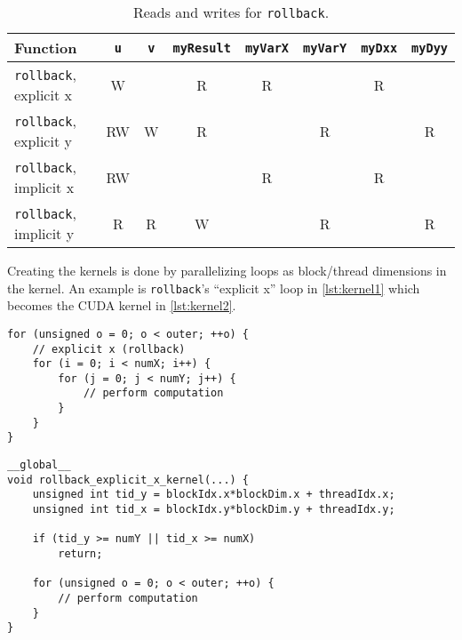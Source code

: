 \documentclass[a4paper]{article}
\begin{document}
\begin{table}
    \centering
    \begin{tabular}{lccccccc}
        \toprule
        \textbf{Function}             & \texttt{u} & \texttt{v} & \texttt{myResult} & \texttt{myVarX} & \texttt{myVarY} & \texttt{myDxx} & \texttt{myDyy} \\
        \midrule
        \texttt{rollback}, explicit x & W          &            & R                 & R               &                 & R              &                \\
        \texttt{rollback}, explicit y & RW         & W          & R                 &                 & R               &                & R              \\
        \texttt{rollback}, implicit x & RW         &            &                   & R               &                 & R              &                \\
        \texttt{rollback}, implicit y & R          & R          & W                 &                 & R               &                & R              \\
        \bottomrule
    \end{tabular}
    \caption{Reads and writes for \texttt{rollback}.}
    \label{tbl:rw_rollback}
\end{table}

Creating the kernels is done by parallelizing loops as block/thread dimensions
in the kernel. An example is \texttt{rollback}'s ``explicit x'' loop in
\autoref{lst:kernel1} which becomes the CUDA kernel in \autoref{lst:kernel2}.

\begin{lstlisting}[caption={The original ``explicit x'' loop in \texttt{rollback}.},label={lst:kernel1}]
for (unsigned o = 0; o < outer; ++o) {
    // explicit x (rollback)
    for (i = 0; i < numX; i++) {
        for (j = 0; j < numY; j++) {
            // perform computation
        }
    }
}
\end{lstlisting}

\begin{lstlisting}[caption={Converting \texttt{rollback}'s ``explicit x'' loop to a CUDA kernel.},label={lst:kernel2}]
__global__
void rollback_explicit_x_kernel(...) {
    unsigned int tid_y = blockIdx.x*blockDim.x + threadIdx.x;
    unsigned int tid_x = blockIdx.y*blockDim.y + threadIdx.y;

    if (tid_y >= numY || tid_x >= numX)
        return;

    for (unsigned o = 0; o < outer; ++o) {
        // perform computation
    }
}
\end{lstlisting}
\end{document}

